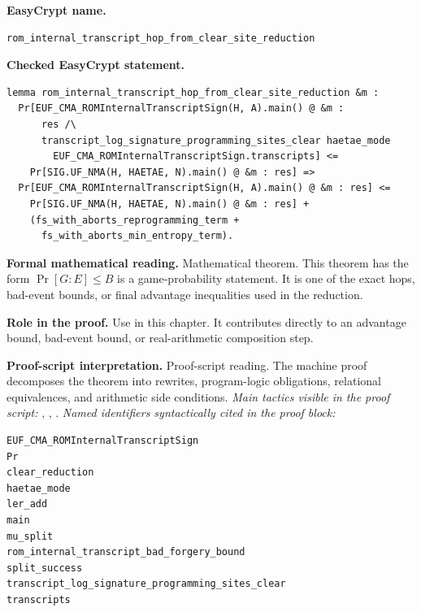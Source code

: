 \begin{formaltheorem}
\noindent\textbf{EasyCrypt name.}
\begin{lstlisting}[language=EasyCrypt,basicstyle=\ttfamily\scriptsize]
rom_internal_transcript_hop_from_clear_site_reduction
\end{lstlisting}
\noindent\textbf{Checked EasyCrypt statement.}
\begin{lstlisting}[language=EasyCrypt,basicstyle=\ttfamily\scriptsize]
lemma rom_internal_transcript_hop_from_clear_site_reduction &m :
  Pr[EUF_CMA_ROMInternalTranscriptSign(H, A).main() @ &m :
      res /\
      transcript_log_signature_programming_sites_clear haetae_mode
        EUF_CMA_ROMInternalTranscriptSign.transcripts] <=
    Pr[SIG.UF_NMA(H, HAETAE, N).main() @ &m : res] =>
  Pr[EUF_CMA_ROMInternalTranscriptSign(H, A).main() @ &m : res] <=
    Pr[SIG.UF_NMA(H, HAETAE, N).main() @ &m : res] +
    (fs_with_aborts_reprogramming_term +
      fs_with_aborts_min_entropy_term).
\end{lstlisting}
\noindent\textbf{Formal mathematical reading.}
Mathematical theorem. This theorem has the form \(\Pr[G:E] \le B\) is a game-probability statement.  It is one of the exact hops, bad-event bounds, or final advantage inequalities used in the reduction.

\noindent\textbf{Role in the proof.}
Use in this chapter. It contributes directly to an advantage bound, bad-event bound, or real-arithmetic composition step.

\noindent\textbf{Proof-script interpretation.}
Proof-script reading. The machine proof decomposes the theorem into rewrites, program-logic obligations, relational equivalences, and arithmetic side conditions.
\emph{Main tactics visible in the proof script:} \ec{have}, \ec{rewrite}, \ec{apply}.
\emph{Named identifiers syntactically cited in the proof block:}
\begin{lstlisting}[language=EasyCrypt,basicstyle=\ttfamily\scriptsize]
EUF_CMA_ROMInternalTranscriptSign
Pr
clear_reduction
haetae_mode
ler_add
main
mu_split
rom_internal_transcript_bad_forgery_bound
split_success
transcript_log_signature_programming_sites_clear
transcripts
\end{lstlisting}

\end{formaltheorem}

